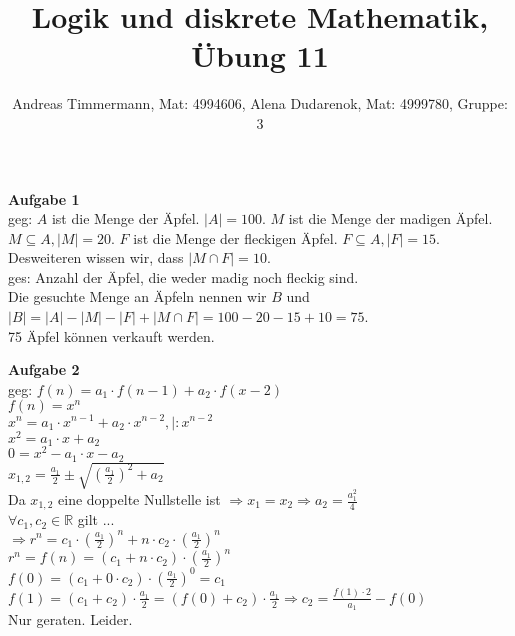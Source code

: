 \documentclass[a4paper]{scrartcl}
\title{Logik und diskrete Mathematik, Übung 11}
\author{Andreas Timmermann, Mat: 4994606, Alena Dudarenok, Mat: 4999780, Gruppe: 3}
\begin{document}
	\maketitle
	\begin{flushleft}
		\textbf{Aufgabe 1}\\
		geg: $A$ ist die Menge der Äpfel. $|A|=100$. $M$ ist die Menge der madigen Äpfel. $M\subseteq A, |M|=20$.  $F$ ist die Menge der fleckigen Äpfel. $F\subseteq A, |F|=15$. Desweiteren wissen wir, dass $|M\cap F|=10$.\\
		ges: Anzahl der Äpfel, die weder madig noch fleckig sind.\\[1em]
		Die gesuchte Menge an Äpfeln nennen wir $B$ und $|B|=|A|-|M|-|F|+|M\cap F| = 100-20-15+10=75$.\\
		75 Äpfel können verkauft werden.\\[1em]
	\end{flushleft}
	\begin{flushleft}
		\textbf{Aufgabe 2}\\
		geg: $f(n)=a_1\cdot f(n-1)+a_2\cdot f(x-2)$\\
		$f(n)=x^n$\\
		$x^n=a_1\cdot x^{n-1}+a_2\cdot x^{n-2}, |:x^{n-2}$\\
		$x^2=a_1\cdot x+a_2$\\
		$0=x^2-a_1\cdot x -a_2$\\
		$x_{1,2}= \frac{a_1}{2}\pm\sqrt{(\frac{a_1}{2})^2+a_2}$\\
		Da $x_{1,2}$ eine doppelte Nullstelle ist $\Rightarrow x_1=x_2\Rightarrow a_2= \frac{a_1^2}{4}$\\
		$\forall c_1,c_2\in\mathbb{R}$ gilt ...\\
		$\Rightarrow r^n=c_1\cdot(\frac{a_1}{2})^n+n\cdot c_2\cdot(\frac{a_1}{2})^n$\\
		$r^n=f(n)=(c_1+n\cdot c_2)\cdot(\frac{a_1}{2})^n$\\
		$f(0)=(c_1+0\cdot c_2)\cdot(\frac{a_1}{2})^0=c_1$\\
		$f(1)=(c_1+c_2)\cdot\frac{a_1}{2}=(f(0)+c_2)\cdot\frac{a_1}{2}\Rightarrow c_2=\frac{f(1)\cdot 2}{a_1}-f(0)$\\[1em]
		Nur geraten. Leider.
	\end{flushleft}
\end{document}
